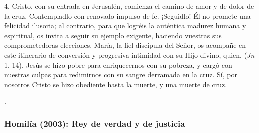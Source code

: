 \begin{body}
4. \txtsmall{(\ldots)} Cristo, con su entrada en Jerusalén, comienza el camino de amor y de dolor de la cruz. Contempladlo con renovado impulso de fe. ¡Seguidlo! Él no promete una felicidad ilusoria; al contrario, para que logréis la auténtica madurez humana y espiritual, os invita a seguir su ejemplo exigente, haciendo vuestras sus comprometedoras elecciones. María, la fiel discípula del Señor, os acompañe en este itinerario de conversión y progresiva intimidad con su Hijo divino, quien,   (\textit{Jn} 1, 14). Jesús se hizo pobre para enriquecernos con su pobreza, y cargó con nuestras culpas para redimirnos con su sangre derramada en la cruz. Sí, por nosotros Cristo se hizo obediente hasta la muerte, y una muerte de cruz.

.
\end{body}


\subsubsection{Homilía (2003): Rey de verdad y de justicia}



